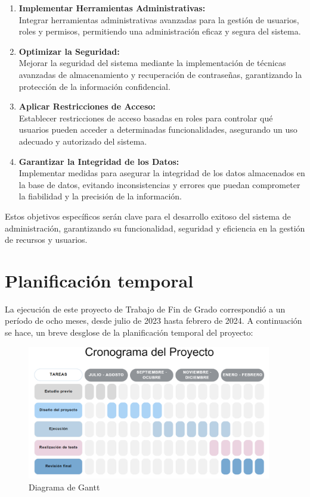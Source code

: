 \documentclass[a4paper, 12pt]{book}
\begin{document}
\begin{enumerate}
  \item \textbf{Implementar Herramientas Administrativas:} \\Integrar herramientas administrativas avanzadas para la gestión de usuarios, roles y permisos, permitiendo una administración eficaz y segura del sistema.
  \item \textbf{Optimizar la Seguridad:} \\Mejorar la seguridad del sistema mediante la implementación de técnicas avanzadas de almacenamiento y recuperación de contraseñas, garantizando la protección de la información confidencial.
  \item \textbf{Aplicar Restricciones de Acceso:} \\Establecer restricciones de acceso basadas en roles para controlar qué usuarios pueden acceder a determinadas funcionalidades, asegurando un uso adecuado y autorizado del sistema.
  \item \textbf{Garantizar la Integridad de los Datos:} \\Implementar medidas para asegurar la integridad de los datos almacenados en la base de datos, evitando inconsistencias y errores que puedan comprometer la fiabilidad y la precisión de la información.
\end{enumerate}

Estos objetivos específicos serán clave para el desarrollo exitoso del sistema de administración, garantizando su funcionalidad, seguridad y eficiencia en la gestión de recursos y usuarios.

\section{Planificación temporal}
\label{sec:planificacion-temporal}
La ejecución de este proyecto de Trabajo de Fin de Grado correspondió a un período de ocho meses, desde julio de 2023 hasta febrero de 2024. A continuación se hace, un breve desglose de la planificación temporal del proyecto:

\begin{figure}
  \centering
  \includegraphics[width=0.95\textwidth]{img/gann.png}
  \caption{Diagrama de Gantt}
  \label{fig:arquitectura}
\end{figure}
\end{document}
